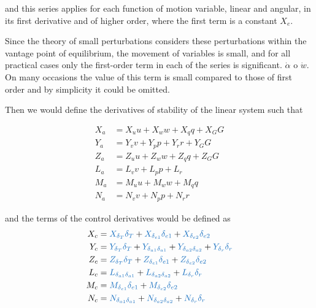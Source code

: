 and this series applies for each function of motion variable, linear and angular, in its first derivative and of higher order, where the first term is a constant $X_{e}$. 

Since the theory of small perturbations considers these perturbations within the vantage point of equilibrium, the movement of variables is small, and for all practical cases only the first-order term in each of the series is significant. $ \dot \alpha$ o $\dot w$. On many occasions the value of this term is small compared to those of first order and by simplicity it could be omitted. 

Then we would define the derivatives of stability of the linear system such that 

\begin{align}
    X_a &= X_u u + X_{w}w + X_q q + X_{G}G \\
    Y_a &= Y_{v}v + Y_{p}p + Y_{r}r + Y_{G}G \\
    Z_a &= Z_u u + Z_{w}w + Z_q q + Z_{G}G  \\
    L_a &= L_{v}v + L_{p}p + L_{r} \\
    M_a &= M_u u + M_{w}w + M_q q \\
    N_a &= N_{v}v + N_{p}p + N_{r}r
\end{align}

and the terms of the control derivatives would be defined as
\begin{align}
\label{eq: entradas de control lineal}
X_c &= \textcolor{RoyalBlue}{X_{\delta_T} \delta_T}  + \textcolor{RoyalBlue}{X_{\delta_{e1}} \delta_{e1}} + \textcolor{RoyalBlue}{X_{\delta_{e2}} \delta_{e2}}  \\
Y_c &= \textcolor{RoyalBlue}{Y_{\delta_T} \delta_T}  + \textcolor{RoyalBlue}{Y_{\delta_{a1}\delta_{a1}}} + \textcolor{RoyalBlue}{Y_{\delta_{a2}\delta_{a2}}} + \textcolor{RoyalBlue}{Y_{\delta_{r}}\delta_{r}} \\
Z_c &= \textcolor{RoyalBlue}{Z_{\delta_T} \delta_T}  + \textcolor{RoyalBlue}{Z_{\delta_{e1}} \delta_{e1}} + \textcolor{RoyalBlue}{Z_{\delta_{e2}} \delta_{e2}}  \\
L_c &= \textcolor{RoyalBlue}{L_{\delta_{a1}\delta_{a1}}} + \textcolor{RoyalBlue}{L_{\delta_{a2}\delta_{a2}}} + \textcolor{RoyalBlue}{L_{\delta_{r}}\delta_{r}} \\
M_c &= \textcolor{RoyalBlue}{M_{\delta_{e1}} \delta_{e1}} + \textcolor{RoyalBlue}{M_{\delta_{e2}} \delta_{e2}} \\
N_c &= \textcolor{RoyalBlue}{N_{\delta_{a1}\delta_{a1}}} + \textcolor{RoyalBlue}{N_{\delta_{a2}\delta_{a2}}} + \textcolor{RoyalBlue}{N_{\delta_{r}}\delta_{r}}
\end{align}



